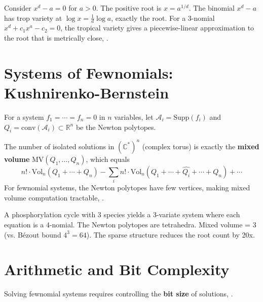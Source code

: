\begin{example}
Consider $x^d - a = 0$ for $a>0$. The positive root is $x = a^{1/d}$. The binomial $x^d - a$ has trop variety at $\log x = \frac{1}{d}\log a$, exactly the root. For a 3-nomial $x^d + c_1 x^a - c_2 = 0$, the tropical variety gives a piecewise-linear approximation to the root that is metrically close, \cite{rojas2025fewnomial}.
\end{example}

\section{Systems of Fewnomials: Kushnirenko-Bernstein} \cite{rojas2025fewnomial}
\label{sec:few:systems}

For a system $f_1 = \cdots = f_n = 0$ in $n$ variables, let $\mathcal{A}_i = \mathrm{Supp}(f_i)$ and $Q_i = \mathrm{conv}(\mathcal{A}_i) \subset \mathbb{R}^n$ be the Newton polytopes.

\begin{theorem} \cite{rojas2025fewnomial}
The number of isolated solutions in $(\mathbb{C}^*)^n$ (complex torus) is exactly the \textbf{mixed volume} $\mathrm{MV}(Q_1,\dots,Q_n)$, which equals
\[
n! \cdot \mathrm{Vol}_n(Q_1 + \cdots + Q_n) - \sum_i n! \cdot \mathrm{Vol}_n(Q_1 + \cdots + \widehat{Q_i} + \cdots + Q_n) + \cdots
\]
For fewnomial systems, the Newton polytopes have few vertices, making mixed volume computation tractable, \cite{rojas2025fewnomial}.
\end{theorem}

\begin{example}
A phosphorylation cycle with 3 species yields a 3-variate system where each equation is a 4-nomial. The Newton polytopes are tetrahedra. Mixed volume = 3 (vs. B\'ezout bound $4^3 = 64$). The sparse structure reduces the root count by 20x.
\end{example}

\section{Arithmetic and Bit Complexity}
\label{sec:few:complexity}

Solving fewnomial systems requires controlling the \textbf{bit size} of solutions, \cite{rojas2025fewnomial}.


